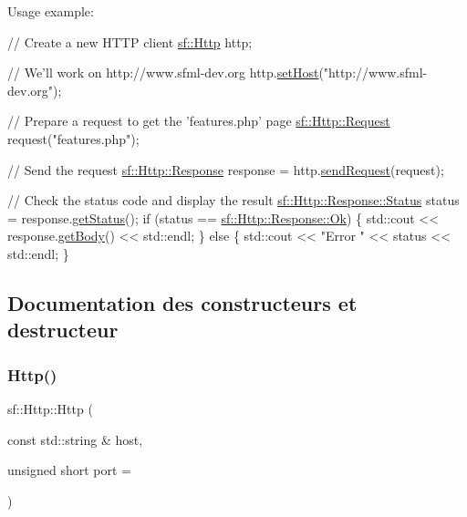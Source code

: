 Usage example\+: 
\begin{DoxyCode}
\textcolor{comment}{// Create a new HTTP client}
\hyperlink{classsf_1_1Http}{sf::Http} http;

\textcolor{comment}{// We'll work on http://www.sfml-dev.org}
http.\hyperlink{classsf_1_1Http_a55121d543b61c41cf20b885a97b04e65}{setHost}(\textcolor{stringliteral}{"http://www.sfml-dev.org"});

\textcolor{comment}{// Prepare a request to get the 'features.php' page}
\hyperlink{classsf_1_1Http_1_1Request}{sf::Http::Request} request(\textcolor{stringliteral}{"features.php"});

\textcolor{comment}{// Send the request}
\hyperlink{classsf_1_1Http_1_1Response}{sf::Http::Response} response = http.\hyperlink{classsf_1_1Http_aaf09ebfb5e00dcc82e0d494d5c6a9e2a}{sendRequest}(request);

\textcolor{comment}{// Check the status code and display the result}
\hyperlink{classsf_1_1Http_1_1Response_a663e071978e30fbbeb20ed045be874d8}{sf::Http::Response::Status} status = response.\hyperlink{classsf_1_1Http_1_1Response_a4271651703764fd9a7d2c0315aff20de}{getStatus}();
\textcolor{keywordflow}{if} (status == \hyperlink{classsf_1_1Http_1_1Response_a663e071978e30fbbeb20ed045be874d8a0158f932254d3f09647dd1f64bd43832}{sf::Http::Response::Ok})
\{
    std::cout << response.\hyperlink{classsf_1_1Http_1_1Response_ab3bfc29867563aa815f6460eeea16136}{getBody}() << std::endl;
\}
\textcolor{keywordflow}{else}
\{
    std::cout << \textcolor{stringliteral}{"Error "} << status << std::endl;
\}
\end{DoxyCode}
 

\subsection{Documentation des constructeurs et destructeur}
\mbox{\label{classsf_1_1Http_a79efd844a735f083fcce0edbf1092385}} 
\subsubsection{\texorpdfstring{Http()}{Http()}}
{\footnotesize\ttfamily sf\+::\+Http\+::\+Http (\begin{DoxyParamCaption}\item[{const std\+::string \&}]{host,  }\item[{unsigned short}]{port = {} }\end{DoxyParamCaption})}



